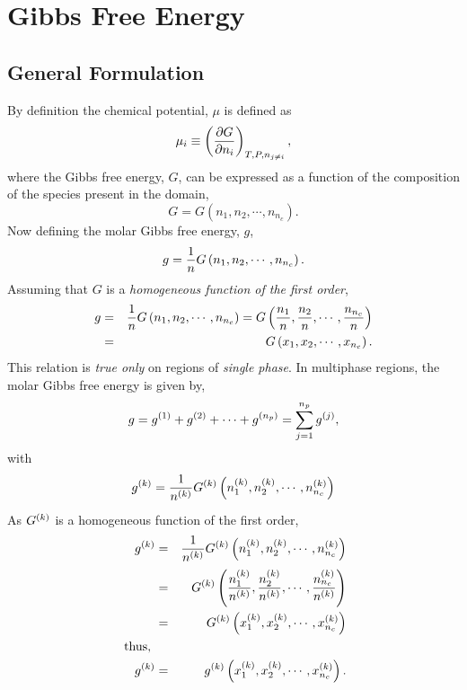 \section{Gibbs Free Energy}\label{Chapter:ThermodynamicFormulation:Section:GibbsEnergy}

\subsection{General Formulation}\label{Chapter:ThermodynamicFormulation:Section:GeneralFormulation}
By definition the chemical potential, $\mu$ is defined as
\begin{equation}
   \mu_{i} \equiv \Partial[G]{n_{i}}{T,P,n_{j\ne i}},
\end{equation}
where the Gibbs free energy, $G$, can be expressed as a function of the composition of the species present in the domain,
\begin{equation}
   G = G\left(n_{1}, n_{2}, \cdots, n_{n_{c}}\right).
\end{equation}
Now defining the molar Gibbs free energy, $g$,
\begin{displaymath}
   g = \frc{1}{n}G\left(n_{1}, n_{2}, \cdots, n_{n_{c}}\right).
\end{displaymath}
Assuming that $G$ is a {\it homogeneous function of the first order},
\begin{eqnarray}
   g &=& \frc{1}{n}G\left(n_{1}, n_{2}, \cdots, n_{n_{c}}\right) = G\left(\frc{n_{1}}{n}, \frc{n_{2}}{n}, \cdots, \frc{n_{n_{c}}}{n}\right) \nonumber \\
     &=& G\left(x_{1}, x_{2}, \cdots, x_{n_{c}}\right). \nonumber
\end{eqnarray}
This relation is {\it true only} on regions of {\it single phase}. In multiphase regions, the molar Gibbs free energy is given by,
\begin{equation}
   g = \mfr[g]{}{1} + \mfr[g]{}{2} + \cdots + \mfr[g]{}{n_{p}} = \summation_{j=1}^{n_{p}}\mfr[g]{}{j},
\end{equation}
with
\begin{displaymath}
   \mfr[g]{}{k} = \frc{1}{\mfr[n]{}{k}} \mfr[G]{}{k}\left(\mfr[n]{1}{k}, \mfr[n]{2}{k}, \cdots, \mfr[n]{n_{c}}{k}\right)
\end{displaymath}
As $\mfr[G]{}{k}$ is a homogeneous function of the first order,
\begin{eqnarray}
 \mfr[g]{}{k} &=& \frc{1}{\mfr[n]{}{k}} \mfr[G]{}{k}\left(\mfr[n]{1}{k}, \mfr[n]{2}{k}, \cdots, \mfr[n]{n_{c}}{k}\right) \nonumber \\
              &=&  \mfr[G]{}{k}\left( \frc{\mfr[n]{1}{k}}{\mfr[n]{}{k}}, \frc{\mfr[n]{2}{k}}{\mfr[n]{}{k}}, \cdots, \frc{\mfr[n]{n_{c}}{k}}{\mfr[n]{}{k}}\right) \nonumber \\
              &=&  \mfr[G]{}{k}\left(\mfr[x]{1}{k}, \mfr[x]{2}{k}, \cdots, \mfr[x]{n_{c}}{k}\right) \nonumber \\
    \text{ thus, }     && \nonumber\\
\mfr[g]{}{k} &=&  \mfr[g]{}{k}\left(\mfr[x]{1}{k}, \mfr[x]{2}{k}, \cdots, \mfr[x]{n_{c}}{k}\right). 
\end{eqnarray}

